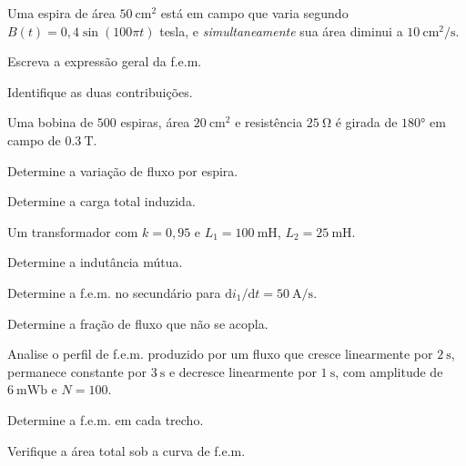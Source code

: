 \begin{questao}[3]{}

Uma espira de área $\SI{50}{\centi\meter\squared}$ está em campo que varia
segundo $B(t)=0{,}4\sin(100\pi t)$ tesla, e \emph{simultaneamente} sua área
diminui a $\SI{10}{\centi\meter\squared\per\second}$.
\begin{itensq}
\item Escreva a expressão geral da f.e.m.
\item Identifique as duas contribuições.
\end{itensq}


\end{questao}
\begin{questao}[3]{}

Uma bobina de $500$ espiras, área $\SI{20}{\centi\meter\squared}$ e resistência
$\SI{25}{\ohm}$ é girada de $\ang{180}$ em campo de $\SI{0.3}{\tesla}$.
\begin{itensq}
\item Determine a variação de fluxo por espira.
\item Determine a carga total induzida.
\end{itensq}


\end{questao}
\begin{questao}[3]{}

Um transformador com $k=0{,}95$ e $L_1=\SI{100}{\milli\henry}$,
$L_2=\SI{25}{\milli\henry}$.
\begin{itensq}
\item Determine a indutância mútua.
\item Determine a f.e.m. no secundário para
      $\mathrm{d}i_1/\mathrm{d}t=\SI{50}{\ampere\per\second}$.
\item Determine a fração de fluxo que não se acopla.
\end{itensq}


\end{questao}
\begin{questao}[3]{}

Analise o perfil de f.e.m. produzido por um fluxo que cresce linearmente por
$\SI{2}{\second}$, permanece constante por $\SI{3}{\second}$ e decresce
linearmente por $\SI{1}{\second}$, com amplitude de $\SI{6}{\milli\weber}$ e
$N=100$.
\begin{itensq}
\item Determine a f.e.m. em cada trecho.
\item Verifique a área total sob a curva de f.e.m.
\end{itensq}


\end{questao}
